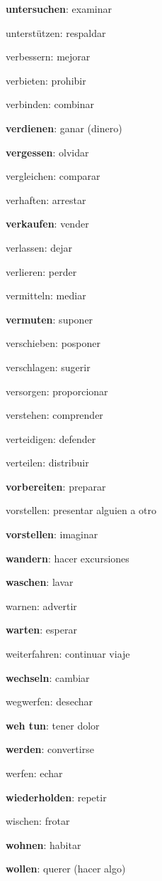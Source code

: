 \begin{multicols}{2}
\begin{myitemize}
\item \textbf{untersuchen}: examinar
\item unterstützen: respaldar
\item verbessern: mejorar
\item verbieten: prohibir
\item verbinden: combinar
\item \textbf{verdienen}: ganar (dinero)
\item \textbf{vergessen}: olvidar
\item vergleichen: comparar
\item verhaften: arrestar
\item \textbf{verkaufen}: vender
\item verlassen: dejar
\item verlieren: perder
\item vermitteln: mediar
\item \textbf{vermuten}: suponer
\item verschieben: posponer
\item verschlagen: sugerir
\item versorgen: proporcionar
\item verstehen: comprender
\item verteidigen: defender
\item verteilen: distribuir
\item \textbf{vorbereiten}: preparar
\item vorstellen: presentar alguien a otro
\item \textbf{vorstellen}: imaginar
\item \textbf{wandern}: hacer excursiones
\item \textbf{waschen}: lavar
\item warnen: advertir
\item \textbf{warten}: esperar
\item weiterfahren: continuar viaje
\item \textbf{wechseln}: cambiar
\item wegwerfen: desechar
\item \textbf{weh tun}: tener dolor
\item \textbf{werden}: convertirse
\item werfen: echar
\item \textbf{wiederholden}: repetir
\item wischen: frotar
\item \textbf{wohnen}: habitar
\item \textbf{wollen}: querer (hacer algo)

\end{myitemize}
\end{multicols}
